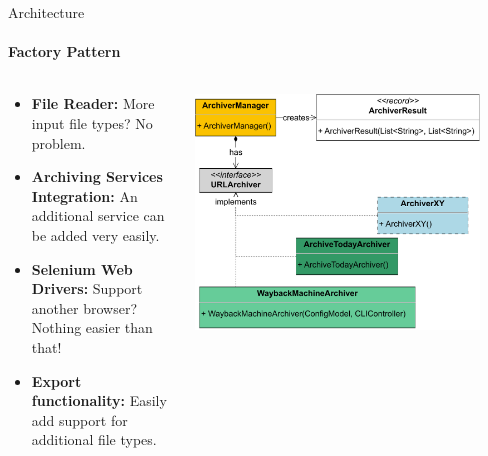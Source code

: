 \documentclass[
    ngerman,%
    authorontitle=true,
]{bfhbeamer}
\begin{document}
	\begin{frame}{Architecture}
		\framesubtitle{Factory Pattern}
		\begin{columns} %
			\begin{column}{0.5\textwidth} %
				\begin{itemize}
					\item \textbf{File Reader:} More input file types? No problem.
					\item \textbf{Archiving Services Integration:} An additional service can be added very easily.
					\item \textbf{Selenium Web Drivers:} Support another browser? Nothing easier than that!
					\item \textbf{Export functionality:} Easily add support for additional file types.
				\end{itemize}
			\end{column}
			\begin{column}{0.5\textwidth} %
				\begin{center}
					\includegraphics[width=0.9\textwidth]{pictures/final_presentation/ArchiverManager_Color.pdf}
				\end{center}
			\end{column}
		\end{columns} %
	\end{frame}
\end{document}
